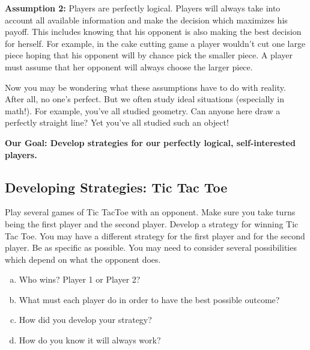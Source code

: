 {\bf Assumption 2:}  Players are perfectly logical. Players will always take into account all available information and make the decision which maximizes his payoff. This includes knowing that his opponent is also making the best decision for herself. 
For example, in the cake cutting game a player wouldn't cut one large piece hoping that his opponent will by chance pick the smaller piece. A player must assume that her opponent will always choose the larger piece.

Now you may be wondering what these assumptions have to do with reality. After all, no one's perfect. But we often study ideal situations (especially in math!). For example, you've all studied geometry. Can anyone here draw a perfectly straight line? Yet you've all studied such an object!


{\bf Our Goal: Develop strategies for our perfectly logical, self-interested players.}

\subsection{Developing Strategies: Tic Tac Toe}\label{Ex:Tic}

\begin{xca} Play several games of Tic TacToe with an opponent. Make sure you take turns being the first player and the second player. Develop a strategy for winning Tic Tac Toe. You may have a different strategy for the first player and for the second player. Be as specific as possible. You may need to consider several possibilities which depend on what the opponent does.

\begin{enumerate}[(a)]
\item Who wins? Player 1 or Player 2?
\item What must each player do in order to have the best possible outcome?
\item How did you develop your strategy?
\item How do you know it will always work?
\end{enumerate}
\end{xca}
 

